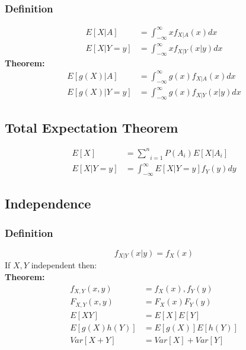 \documentclass[11pt]{article}
\begin{document}
\subsubsection{Definition}
\begin{equation*}
    \begin{split}
        E[X|A] & = \int_{-\infty}^{\infty} xf_{X|A}(x)dx\\
        E[X|Y=y] & = \int_{-\infty}^{\infty} xf_{X|Y}(x|y)dx
    \end{split}
\end{equation*}
\noindent \textbf{Theorem:}\\
\begin{equation*}
    \begin{split}
        E[g(X)|A] & = \int_{-\infty}^{\infty} g(x)f_{X|A}(x)dx\\
        E[g(X)|Y=y] & = \int_{-\infty}^{\infty} g(x)f_{X|Y}(x|y)dx
    \end{split}
\end{equation*}

\subsection{Total Expectation Theorem}
\begin{equation*}
    \begin{split}
        E[X] & = \underset{i=1}{\sum^n} P(A_i) E[X|A_i]\\
        E[X|Y=y] & = \int_{-\infty}^{\infty} E[X|Y=y] f_Y(y)dy
    \end{split}
\end{equation*}

\subsection{Independence}
\subsubsection{Definition}
$$f_{X|Y}(x|y) = f_X(x)$$
\indent If $X, Y$ independent then:\\
\noindent \textbf{Theorem:}\\
\begin{equation*}
    \begin{split}
        f_{X,Y}(x,y) & = f_X(x), f_Y(y)\\
        F_{X,Y}(x,y) & = F_X(x)F_Y(y)\\
        E[XY] & = E[X]E[Y]\\
        E[g(X)h(Y)] & = E[g(X)]E[h(Y)]\\
        Var[X+Y] & = Var[X] + Var[Y]
    \end{split}
\end{equation*}
\end{document}
